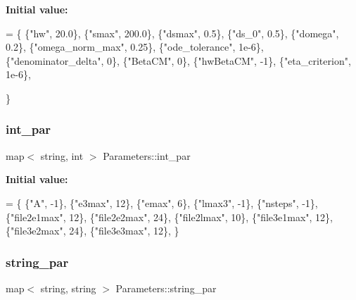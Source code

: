 {\bfseries Initial value\+:}
\begin{DoxyCode}
= \{
  \{\textcolor{stringliteral}{"hw"},        20.0\},
  \{\textcolor{stringliteral}{"smax"},      200.0\}, 
  \{\textcolor{stringliteral}{"dsmax"},     0.5\},   
  \{\textcolor{stringliteral}{"ds\_0"},      0.5\},   
  \{\textcolor{stringliteral}{"domega"},        0.2\},   
  \{\textcolor{stringliteral}{"omega\_norm\_max"},    0.25\},  
  \{\textcolor{stringliteral}{"ode\_tolerance"}, 1e-6\},  
  \{\textcolor{stringliteral}{"denominator\_delta"},    0\},  
  \{\textcolor{stringliteral}{"BetaCM"},               0\},  
  \{\textcolor{stringliteral}{"hwBetaCM"},            -1\},  
  \{\textcolor{stringliteral}{"eta\_criterion"},     1e-6\},  

\}
\end{DoxyCode}
\mbox{\label{classParameters_ac0e364ec60f14ef961c290b092f82163}} 
\subsubsection{\texorpdfstring{int\+\_\+par}{int\_par}}
{\footnotesize\ttfamily map$<$ string, int $>$ Parameters\+::int\+\_\+par\hspace{0.3cm}{\ttfamily [static]}}

{\bfseries Initial value\+:}
\begin{DoxyCode}
= \{
  \{\textcolor{stringliteral}{"A"}, -1\},    
  \{\textcolor{stringliteral}{"e3max"},     12\},    
  \{\textcolor{stringliteral}{"emax"},      6\},
  \{\textcolor{stringliteral}{"lmax3"},     -1\}, 
  \{\textcolor{stringliteral}{"nsteps"},        -1\},    
  \{\textcolor{stringliteral}{"file2e1max"},    12\},
  \{\textcolor{stringliteral}{"file2e2max"},    24\},
  \{\textcolor{stringliteral}{"file2lmax"},     10\},
  \{\textcolor{stringliteral}{"file3e1max"},    12\},
  \{\textcolor{stringliteral}{"file3e2max"},    24\},
  \{\textcolor{stringliteral}{"file3e3max"},    12\},
\}
\end{DoxyCode}
\mbox{\label{classParameters_acc8bbf0ce45ebbaf743bb8e881fcca60}} 
\subsubsection{\texorpdfstring{string\+\_\+par}{string\_par}}
{\footnotesize\ttfamily map$<$ string, string $>$ Parameters\+::string\+\_\+par\hspace{0.3cm}{\ttfamily [static]}}

